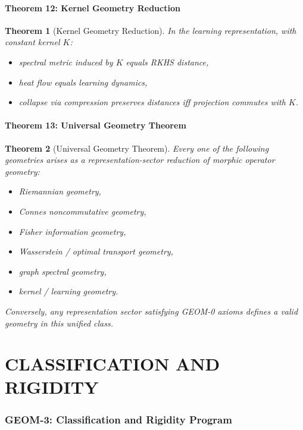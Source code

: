 \documentclass[12pt, oneside]{article}
\newtheorem{theorem}{Theorem}[section]
\begin{document}
\subsection{Theorem 12: Kernel Geometry Reduction}

\begin{theorem}[Kernel Geometry Reduction]
In the learning representation, with constant kernel $K$:
\begin{itemize}
    \item spectral metric induced by $K$ equals RKHS distance,
    \item heat flow equals learning dynamics,
    \item collapse via compression preserves distances iff projection commutes with $K$.
\end{itemize}
\end{theorem}

\subsection{Theorem 13: Universal Geometry Theorem}

\begin{theorem}[Universal Geometry Theorem]
Every one of the following geometries arises as a representation-sector reduction of morphic operator geometry:
\begin{itemize}
    \item Riemannian geometry,
    \item Connes noncommutative geometry,
    \item Fisher information geometry,
    \item Wasserstein / optimal transport geometry,
    \item graph spectral geometry,
    \item kernel / learning geometry.
\end{itemize}
Conversely, any representation sector satisfying GEOM-0 axioms defines a valid geometry in this unified class.
\end{theorem}

\part{CLASSIFICATION AND RIGIDITY}

\section{GEOM-3: Classification and Rigidity Program}
\end{document}
